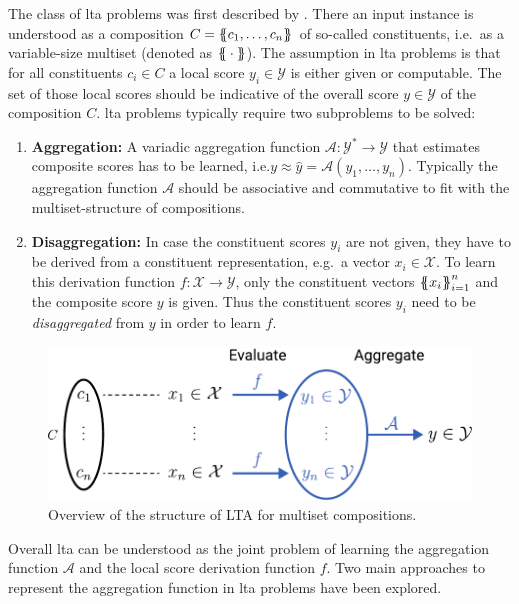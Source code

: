 The class of \ac{lta} problems was first described by \citet{Melnikov2016}.
There an input instance is understood as a composition $C = \ldblbrace c_1, \dots, c_n \rdblbrace$ of so-called constituents, i.e.\ as a variable-size multiset (denoted as $\ldblbrace \cdot \rdblbrace$).
The assumption in \ac{lta} problems is that for all constituents $c_i \in C$ a local score $y_i \in \mathcal{Y}$ is either given or computable.
The set of those local scores should be indicative of the overall score $y \in \mathcal{Y}$ of the composition $C$.
\ac{lta} problems typically require two subproblems to be solved:
\begin{enumerate}[label=\textbf{\arabic*.}]
	\item \textbf{Aggregation:}
		A variadic aggregation function $\mathcal{A}: \mathcal{Y}^{*} \to \mathcal{Y}$ that estimates composite scores has to be learned, i.e.\@ $y \approx \hat{y} = \mathcal{A}(y_{1}, \dots, y_{n})$.
		Typically the aggregation function $\mathcal{A}$ should be associative and commutative to fit with the multiset-structure of compositions.
	\item \textbf{Disaggregation:}
		In case the constituent scores $y_i$ are not given, they have to be derived from a constituent representation, e.g.\ a vector $x_i \in \mathcal{X}$.
		To learn this derivation function $f: \mathcal{X} \to \mathcal{Y}$, only the constituent vectors ${\ldblbrace x_i \rdblbrace}_{i = 1}^{n}$ and the composite score $y$ is given.
		Thus the constituent scores $y_i$ need to be \textit{disaggregated} from $y$ in order to learn $f$.
\end{enumerate}
\begin{figure}[ht]
	\centering
	\includegraphics[width=0.7\linewidth]{gfx/related-work/lta-overview.pdf}
	\caption{Overview of the structure of LTA for multiset compositions.}\label{fig:related:lta-overview}
\end{figure}
Overall \ac{lta} can be understood as the joint problem of learning the aggregation function $\mathcal{A}$ and the local score derivation function $f$.
Two main approaches to represent the aggregation function in \ac{lta} problems have been explored.

